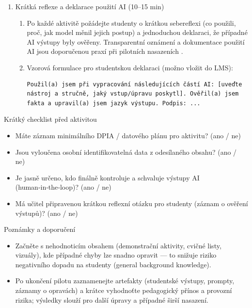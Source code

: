 \begin{enumerate}
  \item Krátká reflexe a deklarace použití AI (10–15 min)
    \begin{enumerate}
      \item Po každé aktivitě požádejte studenty o krátkou sebereflexi (co použili, proč, jak model měnil jejich postup) a jednoduchou deklaraci, že případné AI výstupy byly ověřeny. Transparentní oznámení a dokumentace použití AI jsou doporučenou praxí při pilotních nasazeních \cite{kb_malinka_chatgpt_ve_vyuce_dva_roky_pote_2024_pdf_90bc3aaf_page_12_1}.
      \item Vzorová formulace pro studentskou deklaraci (možno vložit do LMS):
\begin{verbatim}
Použil(a) jsem při vypracování následujících částí AI: [uveďte nástroj a stručně, jaký vstup/úpravu poskytl]. Ověřil(a) jsem fakta a upravil(a) jsem jazyk výstupu. Podpis: ...
\end{verbatim}
    \end{enumerate}
\end{enumerate}

Krátký checklist před aktivitou
\begin{itemize}
  \item Máte záznam minimálního DPIA / datového plánu pro aktivitu? (ano / ne) \cite{kb_malinka_chatgpt_ve_vyuce_dva_roky_pote_2024_pdf_90bc3aaf_page_12_1}
  \item Jsou vyloučena osobní identifikovatelná data z odesílaného obsahu? (ano / ne) \cite{kb_malinka_chatgpt_ve_vyuce_dva_roky_pote_2024_pdf_90bc3aaf_page_12_1}
  \item Je jasně určeno, kdo finálně kontroluje a schvaluje výstupy AI (human‑in‑the‑loop)? (ano / ne) \cite{kb_malinka_chatgpt_ve_vyuce_dva_roky_pote_2024_pdf_90bc3aaf_page_12_1}
  \item Má učitel připravenou krátkou reflexní otázku pro studenty (záznam o ověření výstupů)? (ano / ne)
\end{itemize}

Poznámky a doporučení
\begin{itemize}
  \item Začněte s nehodnoticím obsahem (demonstrační aktivity, cvičné listy, vizuály), kde případné chyby lze snadno opravit — to snižuje riziko negativního dopadu na studenty (general background knowledge).
  \item Po ukončení pilotu zaznamenejte artefakty (studentské výstupy, prompty, záznamy o opravách) a krátce vyhodnoťte pedagogický přínos a provozní rizika; výsledky slouží pro další úpravy a případné širší nasazení.
\end{itemize}